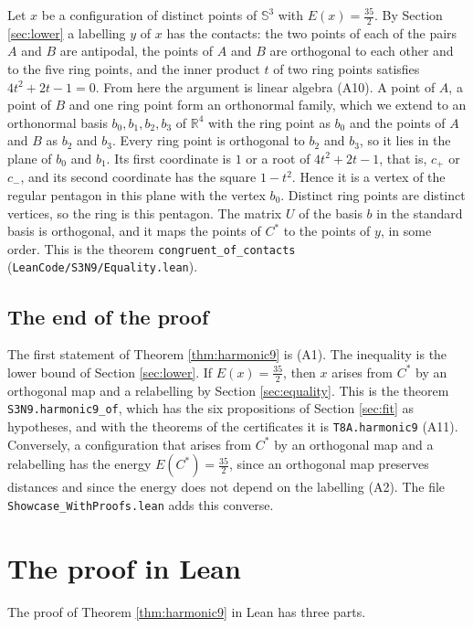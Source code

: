 \documentclass[reqno,a4paper,11pt]{amsart}
\numberwithin{equation}{section}
\def\R{{\mathbb R}}
\newcommand{\Sph}{\mathbb{S}}
\newcommand{\lean}[1]{\texttt{#1}}
\newcommand{\file}[1]{\nolinkurl{#1}}
\begin{document}
Let $x$ be a configuration of distinct points of $\Sph^3$ with $E(x) = \tfrac{35}{2}$. By Section \ref{sec:lower} a labelling $y$ of $x$ has the contacts: the two points of each of the pairs $A$ and $B$ are antipodal, the points of $A$ and $B$ are orthogonal to each other and to the five ring points, and the inner product $t$ of two ring points satisfies $4 t^2 + 2 t - 1 = 0$. From here the argument is linear algebra (A10). A point of $A$, a point of $B$ and one ring point form an orthonormal family, which we extend to an orthonormal basis $b_0, b_1, b_2, b_3$ of $\R^4$ with the ring point as $b_0$ and the points of $A$ and $B$ as $b_2$ and $b_3$. Every ring point is orthogonal to $b_2$ and $b_3$, so it lies in the plane of $b_0$ and $b_1$. Its first coordinate is $1$ or a root of $4 t^2 + 2 t - 1$, that is, $c_+$ or $c_-$, and its second coordinate has the square $1 - t^2$. Hence it is a vertex of the regular pentagon in this plane with the vertex $b_0$. Distinct ring points are distinct vertices, so the ring is this pentagon. The matrix $U$ of the basis $b$ in the standard basis is orthogonal, and it maps the points of $C^*$ to the points of $y$, in some order. This is the theorem \lean{congruent\_of\_contacts} (\file{LeanCode/S3N9/Equality.lean}).

\subsection{The end of the proof}

The first statement of Theorem \ref{thm:harmonic9} is (A1). The inequality is the lower bound of Section \ref{sec:lower}. If $E(x) = \tfrac{35}{2}$, then $x$ arises from $C^*$ by an orthogonal map and a relabelling by Section \ref{sec:equality}. This is the theorem \lean{S3N9.harmonic9\_of}, which has the six propositions of Section \ref{sec:fit} as hypotheses, and with the theorems of the certificates it is \lean{T8A.harmonic9} (A11). Conversely, a configuration that arises from $C^*$ by an orthogonal map and a relabelling has the energy $E(C^*) = \tfrac{35}{2}$, since an orthogonal map preserves distances and since the energy does not depend on the labelling (A2). The file \file{Showcase_WithProofs.lean} adds this converse.

\section{The proof in Lean}\label{sec:lean}

The proof of Theorem \ref{thm:harmonic9} in Lean has three parts.
\end{document}

